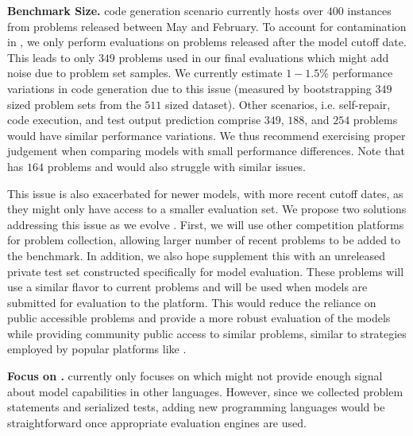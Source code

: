 \vspace{1pt}
\noindent \textbf{Benchmark Size.}
\livecodebench{} code generation scenario currently hosts over $400$ instances from problems released between May and February.
To account for contamination in \deepseek{}, we only perform evaluations on problems released after the model cutoff date.
This leads to only $349$ problems used in our final evaluations which might add noise due to problem set samples.
We currently estimate $1-1.5\%$ performance variations in \livecodebench{} code generation due to this issue (measured by bootstrapping $349$ sized problem sets from the $511$ sized dataset).
Other scenarios, i.e. self-repair, code execution, and test output prediction comprise $349$, $188$, and $254$ problems would have similar performance variations. 
We thus recommend exercising proper judgement when comparing models with small performance differences.
Note that \humaneval{} has $164$ problems and would also struggle with similar issues.

This issue is also exacerbated for newer models, with more recent cutoff dates, as they might only have access to a smaller evaluation set.
We propose two solutions addressing this issue as we evolve \livecodebench{}.
First, we will use other competition platforms for problem collection, allowing larger number of recent problems to be added to the benchmark.
In addition, we also hope supplement this with an unreleased private test set constructed specifically for model evaluation. 
These problems will use a similar flavor to current problems and will be used when models are submitted for evaluation to the \livecodebench{} platform.
This would reduce the reliance on public accessible problems and provide a more robust evaluation of the models while providing community public access to similar problems, similar to strategies employed by popular platforms like .

\vspace{1pt}
\noindent \textbf{Focus on \python{}.} 
\livecodebench{} currently only focuses on \python{} which might not provide enough signal about model capabilities in other languages. 
However, since we collected problem statements and serialized tests, adding new programming languages would be straightforward once appropriate evaluation engines are used.

